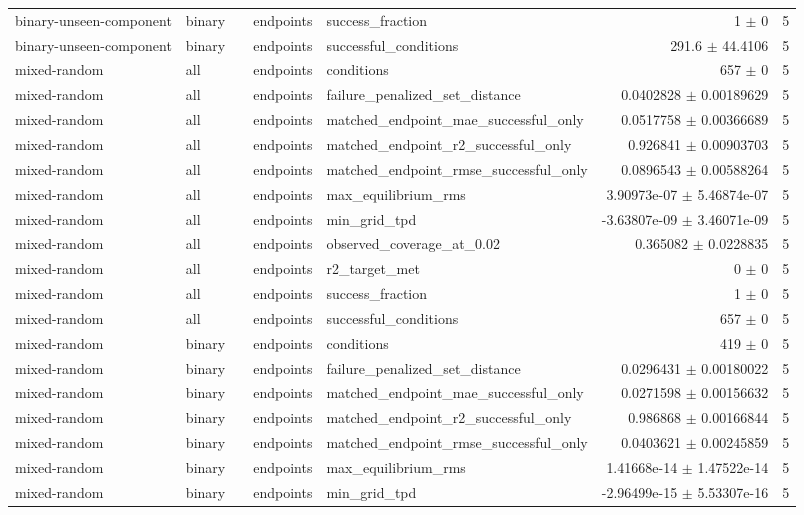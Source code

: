 \begin{tabular}{lllllrr}
binary-unseen-component & binary &  & endpoints & success_fraction & 1 $\pm$ 0 & 5 \\
binary-unseen-component & binary &  & endpoints & successful_conditions & 291.6 $\pm$ 44.4106 & 5 \\
mixed-random & all &  & endpoints & conditions & 657 $\pm$ 0 & 5 \\
mixed-random & all &  & endpoints & failure_penalized_set_distance & 0.0402828 $\pm$ 0.00189629 & 5 \\
mixed-random & all &  & endpoints & matched_endpoint_mae_successful_only & 0.0517758 $\pm$ 0.00366689 & 5 \\
mixed-random & all &  & endpoints & matched_endpoint_r2_successful_only & 0.926841 $\pm$ 0.00903703 & 5 \\
mixed-random & all &  & endpoints & matched_endpoint_rmse_successful_only & 0.0896543 $\pm$ 0.00588264 & 5 \\
mixed-random & all &  & endpoints & max_equilibrium_rms & 3.90973e-07 $\pm$ 5.46874e-07 & 5 \\
mixed-random & all &  & endpoints & min_grid_tpd & -3.63807e-09 $\pm$ 3.46071e-09 & 5 \\
mixed-random & all &  & endpoints & observed_coverage_at_0.02 & 0.365082 $\pm$ 0.0228835 & 5 \\
mixed-random & all &  & endpoints & r2_target_met & 0 $\pm$ 0 & 5 \\
mixed-random & all &  & endpoints & success_fraction & 1 $\pm$ 0 & 5 \\
mixed-random & all &  & endpoints & successful_conditions & 657 $\pm$ 0 & 5 \\
mixed-random & binary &  & endpoints & conditions & 419 $\pm$ 0 & 5 \\
mixed-random & binary &  & endpoints & failure_penalized_set_distance & 0.0296431 $\pm$ 0.00180022 & 5 \\
mixed-random & binary &  & endpoints & matched_endpoint_mae_successful_only & 0.0271598 $\pm$ 0.00156632 & 5 \\
mixed-random & binary &  & endpoints & matched_endpoint_r2_successful_only & 0.986868 $\pm$ 0.00166844 & 5 \\
mixed-random & binary &  & endpoints & matched_endpoint_rmse_successful_only & 0.0403621 $\pm$ 0.00245859 & 5 \\
mixed-random & binary &  & endpoints & max_equilibrium_rms & 1.41668e-14 $\pm$ 1.47522e-14 & 5 \\
mixed-random & binary &  & endpoints & min_grid_tpd & -2.96499e-15 $\pm$ 5.53307e-16 & 5 \\

\end{tabular}
